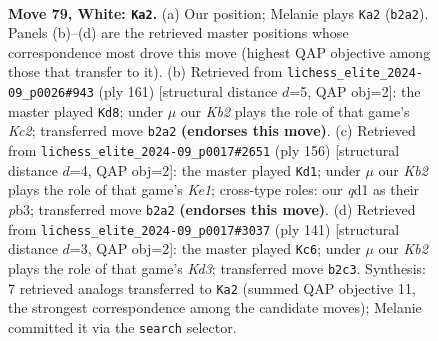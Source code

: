 \documentclass[11pt]{article}
\begin{document}
\clearpage

\begin{figure}[p]\centering
\begin{subfigure}{0.46\textwidth}\centering
\resizebox{\linewidth}{!}{%
\newchessgame
\chessboard[
  setfen={8/7k/1p6/p7/2P5/8/1K6/3q4 w - - 14 79},
  showmover=false,
  pgfstyle=straightmove, color=movearrow, markmove={b2-a2}
]}
\caption{}
\end{subfigure}\hfill
\begin{subfigure}{0.46\textwidth}\centering
\resizebox{\linewidth}{!}{%
\newchessgame
\chessboard[
  setfen={8/2k5/p7/P7/1P2K3/8/8/8 b - - 0 81},
  showmover=false,
  pgfstyle=straightmove, color=movearrow, markmove={c7-d8}
]}
\caption{}
\end{subfigure}
\\[4pt]
\begin{subfigure}{0.46\textwidth}\centering
\resizebox{\linewidth}{!}{%
\newchessgame
\chessboard[
  setfen={8/8/8/3k2p1/5pP1/1p6/8/4K3 w - - 0 79},
  showmover=false,
  pgfstyle=straightmove, color=movearrow, markmove={e1-d1}
]}
\caption{}
\end{subfigure}\hfill
\begin{subfigure}{0.46\textwidth}\centering
\resizebox{\linewidth}{!}{%
\newchessgame
\chessboard[
  setfen={8/5Q2/3k4/8/4K3/2P5/1P6/8 b - - 2 71},
  showmover=false,
  pgfstyle=straightmove, color=movearrow, markmove={d6-c6}
]}
\caption{}
\end{subfigure}
\caption{\textbf{Move 79, White: \texttt{Ka2}.} (a) Our position; Melanie plays \texttt{Ka2} (\texttt{b2a2}). Panels (b)--(d) are the retrieved master positions whose correspondence most drove this move (highest QAP objective among those that transfer to it). (b) Retrieved from \texttt{lichess\_elite\_2024-09\_p0026\#943} (ply 161) [structural distance $d$=5, QAP obj=2]: the master played \texttt{Kd8}; under $\mu$ our \emph{Kb2} plays the role of that game's \emph{Kc2}; transferred move \texttt{b2a2} \textbf{(endorses this move)}. (c) Retrieved from \texttt{lichess\_elite\_2024-09\_p0017\#2651} (ply 156) [structural distance $d$=4, QAP obj=2]: the master played \texttt{Kd1}; under $\mu$ our \emph{Kb2} plays the role of that game's \emph{Ke1}; cross-type roles: our \emph{q}d1 as their \emph{p}b3; transferred move \texttt{b2a2} \textbf{(endorses this move)}. (d) Retrieved from \texttt{lichess\_elite\_2024-09\_p0017\#3037} (ply 141) [structural distance $d$=3, QAP obj=2]: the master played \texttt{Kc6}; under $\mu$ our \emph{Kb2} plays the role of that game's \emph{Kd3}; transferred move \texttt{b2c3}. Synthesis: 7 retrieved analogs transferred to \texttt{Ka2} (summed QAP objective 11, the strongest correspondence among the candidate moves); Melanie committed it via the \texttt{search} selector.}
\label{fig:thought-m156}
\end{figure}
\end{document}
